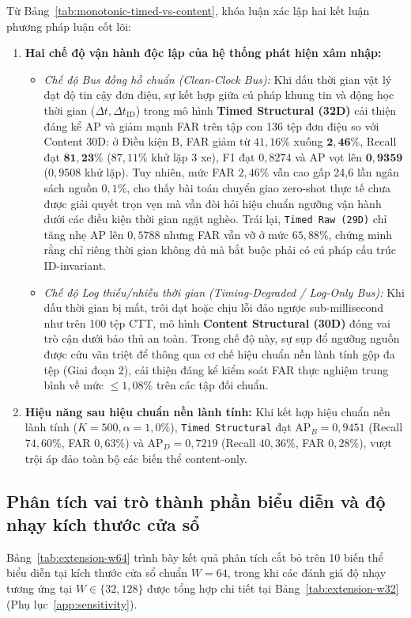 \documentclass[12pt, a4paper, reqno, oneside]{book}
\DeclareRobustCommand{\code}[1]{\nolinkurl{#1}}
\begin{document}
Từ Bảng~\ref{tab:monotonic-timed-vs-content}, khóa luận xác lập hai kết luận phương pháp luận cốt lõi:
\begin{enumerate}
    \item \textbf{Hai chế độ vận hành độc lập của hệ thống phát hiện xâm nhập:}
    \begin{itemize}
        \item \textit{Chế độ Bus đồng hồ chuẩn (Clean-Clock Bus):} Khi dấu thời gian vật lý đạt độ tin cậy đơn điệu, sự kết hợp giữa cú pháp khung tin và động học thời gian ($\Delta t, \Delta t_{\text{ID}}$) trong mô hình \textbf{Timed Structural (32D)} cải thiện đáng kể AP và giảm mạnh FAR trên tập con 136 tệp đơn điệu so với Content 30D: ở Điều kiện B, FAR giảm từ $41{,}16\%$ xuống $\mathbf{2{,}46\%}$, Recall đạt $\mathbf{81{,}23\%}$ ($87{,}11\%$ khử lặp 3 xe), F1 đạt $0{,}8274$ và AP vọt lên $\mathbf{0{,}9359}$ ($0{,}9508$ khử lặp). Tuy nhiên, mức FAR $2{,}46\%$ vẫn cao gấp 24,6 lần ngân sách nguồn $0{,}1\%$, cho thấy bài toán chuyển giao zero-shot thực tế chưa được giải quyết trọn vẹn mà vẫn đòi hỏi hiệu chuẩn ngưỡng vận hành dưới các điều kiện thời gian ngặt nghèo. Trái lại, \code{Timed Raw (29D)} chỉ tăng nhẹ AP lên $0{,}5788$ nhưng FAR vẫn vỡ ở mức $65{,}88\%$, chứng minh rằng chỉ riêng thời gian không đủ mà bắt buộc phải có cú pháp cấu trúc ID-invariant.
        \item \textit{Chế độ Log thiếu/nhiễu thời gian (Timing-Degraded / Log-Only Bus):} Khi dấu thời gian bị mất, trôi dạt hoặc chịu lỗi đảo ngược sub-millisecond như trên 100 tệp CTT, mô hình \textbf{Content Structural (30D)} đóng vai trò cận dưới bảo thủ an toàn. Trong chế độ này, sự sụp đổ ngưỡng nguồn được cứu vãn triệt để thông qua cơ chế hiệu chuẩn nền lành tính gộp đa tệp (Giai đoạn 2), cải thiện đáng kể kiểm soát FAR thực nghiệm trung bình về mức $\le 1{,}08\%$ trên các tập đối chuẩn.
    \end{itemize}
    \item \textbf{Hiệu năng sau hiệu chuẩn nền lành tính:} Khi kết hợp hiệu chuẩn nền lành tính ($K=500, \alpha=1{,}0\%$), \code{Timed Structural} đạt $\text{AP}_B=0{,}9451$ (Recall $74{,}60\%$, FAR $0{,}63\%$) và $\text{AP}_D=0{,}7219$ (Recall $40{,}36\%$, FAR $0{,}28\%$), vượt trội áp đảo toàn bộ các biến thể content-only.
\end{enumerate}

\subsection{Phân tích vai trò thành phần biểu diễn và độ nhạy kích thước cửa sổ}\label{sec:completion}
Bảng~\ref{tab:extension-w64} trình bày kết quả phân tích cắt bỏ trên 10 biến thể biểu diễn tại kích thước cửa sổ chuẩn $W=64$, trong khi các đánh giá độ nhạy tương ứng tại $W \in \{32, 128\}$ được tổng hợp chi tiết tại Bảng~\ref{tab:extension-w32} (Phụ lục~\ref{app:sensitivity}).
\end{document}
